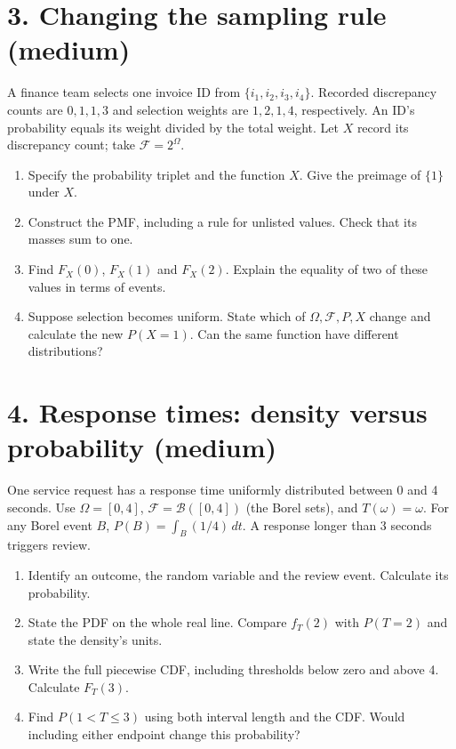 \documentclass[11pt,a4paper]{article}
\begin{document}
\clearpage
\section*{3. Changing the sampling rule (medium)}
A finance team selects one invoice ID from $\{i_1,i_2,i_3,i_4\}$. Recorded discrepancy counts are $0,1,1,3$ and selection weights are $1,2,1,4$, respectively. An ID's probability equals its weight divided by the total weight. Let $X$ record its discrepancy count; take $\mathcal F=2^\Omega$.
\begin{enumerate}
\item Specify the probability triplet and the function $X$. Give the preimage of $\{1\}$ under $X$.
\item Construct the PMF, including a rule for unlisted values. Check that its masses sum to one.
\item Find $F_X(0)$, $F_X(1)$ and $F_X(2)$. Explain the equality of two of these values in terms of events.
\item Suppose selection becomes uniform. State which of $\Omega,\mathcal F,P,X$ change and calculate the new $P(X=1)$. Can the same function have different distributions?
\end{enumerate}

\section*{4. Response times: density versus probability (medium)}
One service request has a response time uniformly distributed between 0 and 4 seconds. Use $\Omega=[0,4]$, $\mathcal F=\mathcal B([0,4])$ (the Borel sets), and $T(\omega)=\omega$. For any Borel event $B$, $P(B)=\int_B(1/4)\,dt$. A response longer than 3 seconds triggers review.
\begin{enumerate}
\item Identify an outcome, the random variable and the review event. Calculate its probability.
\item State the PDF on the whole real line. Compare $f_T(2)$ with $P(T=2)$ and state the density's units.
\item Write the full piecewise CDF, including thresholds below zero and above 4. Calculate $F_T(3)$.
\item Find $P(1<T\le3)$ using both interval length and the CDF. Would including either endpoint change this probability?
\end{enumerate}

\clearpage
\end{document}
